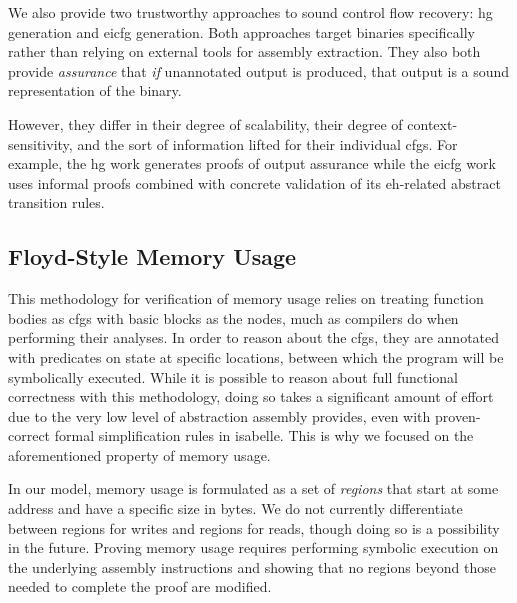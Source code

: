 We also provide two trustworthy approaches to sound control flow recovery: \ac{hg} generation and \ac{eicfg} generation.
Both approaches target binaries specifically rather than relying on external tools for assembly extraction.
They also both provide \emph{assurance} that \emph{if} unannotated output is produced, that output is a sound representation of the binary.

However, they differ in their degree of scalability, their degree of context-sensitivity, and the sort of information lifted for their individual \acp{cfg}.
For example, the \ac{hg} work generates proofs of output assurance while the \ac{eicfg} work uses informal proofs combined with concrete validation of its \ac{eh}-related abstract transition rules.

\begin{comment}
  For example, we have shown that we can formally verify approximately \num{12000} lines of assembly code obtained by disassembling binaries of the Xen hypervisor \autocite{xen} with minimal user interaction.

  To fill the latter gap, we provide binary-level approaches to dealing with complex, interprocedural control flow in the presence of indirect branches and even exceptions.
  First, a more general \emph{\ac{hg}} approach, followed by one focused specifically on \emph{exceptional control flow}, \emph{\acp{eicfg}}.
  We have found no other approaches that lift binaries to \ac{eicfg}-like constructs.
\end{comment}

\subsection{Floyd-Style Memory Usage}
This methodology for verification of memory usage relies on treating function bodies as \acp{cfg} with basic blocks as the nodes, much as compilers do when performing their analyses.
In order to reason about the \acp{cfg}, they are annotated with predicates on state at specific locations, between which the program will be symbolically executed.
While it is possible to reason about full functional correctness with this methodology, doing so takes a significant amount of effort due to the very low level of abstraction assembly provides, even with proven-correct formal simplification rules in \gls{isabelle}.
This is why we focused on the aforementioned property of memory usage.

In our model, memory usage is formulated as a set of \emph{regions} that start at some address and have a specific size in bytes.
We do not currently differentiate between regions for writes and regions for reads, though doing so is a possibility in the future.
Proving memory usage requires performing symbolic execution on the underlying assembly instructions and showing that no regions beyond those needed to complete the proof are modified.

